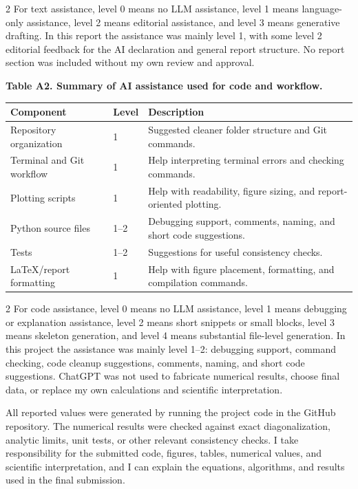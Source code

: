 \documentclass[10pt,a4paper]{article}
\begin{document}
\begin{multicols}{2}
For text assistance, level 0 means no LLM assistance, level 1 means language-only assistance, level 2 means editorial assistance, and level 3 means generative drafting. In this report the assistance was mainly level 1, with some level 2 editorial feedback for the AI declaration and general report structure. No report section was included without my own review and approval.
\end{multicols}

\noindent\textbf{Table A2. Summary of AI assistance used for code and workflow.}

\begin{center}
\setlength{\tabcolsep}{4pt}
\begin{tabularx}{\textwidth}{@{}p{}p{}X@{}}
\toprule
\textbf{Component} & \textbf{Level} & \textbf{Description} \\
\midrule
Repository organization & 1 & Suggested cleaner folder structure and Git commands. \\
Terminal and Git workflow & 1 & Help interpreting terminal errors and checking commands. \\
Plotting scripts & 1 & Help with readability, figure sizing, and report-oriented plotting. \\
Python source files & 1--2 & Debugging support, comments, naming, and short code suggestions. \\
Tests & 1--2 & Suggestions for useful consistency checks. \\
\LaTeX{}/report formatting & 1 & Help with figure placement, formatting, and compilation commands. \\
\bottomrule
\end{tabularx}
\end{center}

\begin{multicols}{2}
For code assistance, level 0 means no LLM assistance, level 1 means debugging or explanation assistance, level 2 means short snippets or small blocks, level 3 means skeleton generation, and level 4 means substantial file-level generation. In this project the assistance was mainly level 1--2: debugging support, command checking, code cleanup suggestions, comments, naming, and short code suggestions. ChatGPT was not used to fabricate numerical results, choose final data, or replace my own calculations and scientific interpretation.

All reported values were generated by running the project code in the GitHub repository. The numerical results were checked against exact diagonalization, analytic limits, unit tests, or other relevant consistency checks. I take responsibility for the submitted code, figures, tables, numerical values, and scientific interpretation, and I can explain the equations, algorithms, and results used in the final submission.
\end{multicols}
\end{document}
